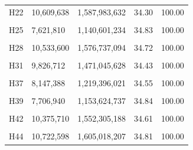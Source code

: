 \documentclass[
  a4paper,
  titlepage]{article}
\begin{document}
\begin{longtable}[t]{lllll}
H22 & 10,609,638 & 1,587,983,632 & 34.30 & 100.00\\
 
\cellcolor{gray!6}{H23} & \cellcolor{gray!6}{7,580,778} & \cellcolor{gray!6}{1,134,534,547} & \cellcolor{gray!6}{34.55} & \cellcolor{gray!6}{100.00}\\
 
H25 & 7,621,810 & 1,140,601,234 & 34.83 & 100.00\\
 
\cellcolor{gray!6}{H26} & \cellcolor{gray!6}{9,022,580} & \cellcolor{gray!6}{1,350,116,166} & \cellcolor{gray!6}{35.05} & \cellcolor{gray!6}{100.00}\\
 
H28 & 10,533,600 & 1,576,737,094 & 34.72 & 100.00\\
 
\cellcolor{gray!6}{H30} & \cellcolor{gray!6}{9,511,302} & \cellcolor{gray!6}{1,423,225,341} & \cellcolor{gray!6}{34.46} & \cellcolor{gray!6}{100.00}\\
 
H31 & 9,826,712 & 1,471,045,628 & 34.43 & 100.00\\
 
\cellcolor{gray!6}{H36} & \cellcolor{gray!6}{11,697,444} & \cellcolor{gray!6}{1,751,007,262} & \cellcolor{gray!6}{34.85} & \cellcolor{gray!6}{100.00}\\
 
H37 & 8,147,388 & 1,219,396,021 & 34.55 & 100.00\\
 
\cellcolor{gray!6}{H38} & \cellcolor{gray!6}{10,386,840} & \cellcolor{gray!6}{1,554,374,876} & \cellcolor{gray!6}{34.57} & \cellcolor{gray!6}{100.00}\\
 
H39 & 7,706,940 & 1,153,624,737 & 34.84 & 100.00\\
 
\cellcolor{gray!6}{H41} & \cellcolor{gray!6}{12,306,578} & \cellcolor{gray!6}{1,841,880,684} & \cellcolor{gray!6}{34.72} & \cellcolor{gray!6}{100.00}\\
 
H42 & 10,375,710 & 1,552,305,188 & 34.61 & 100.00\\
 
\cellcolor{gray!6}{H43} & \cellcolor{gray!6}{8,383,702} & \cellcolor{gray!6}{1,254,989,504} & \cellcolor{gray!6}{35.06} & \cellcolor{gray!6}{100.00}\\
 
H44 & 10,722,598 & 1,605,018,207 & 34.81 & 100.00\\
 

\end{longtable}
\end{document}

